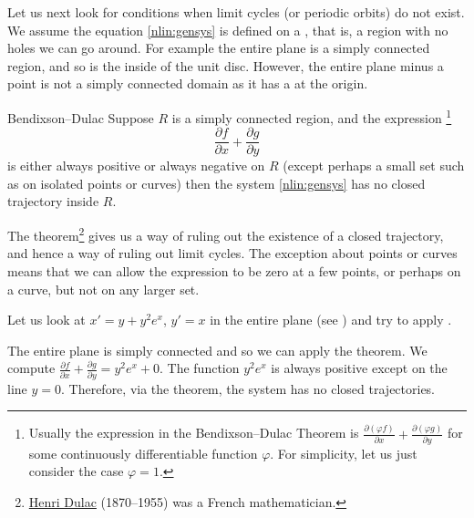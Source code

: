 \medskip

Let us next look for conditions when limit cycles (or periodic orbits) do not exist.
We assume
the equation \eqref{nlin:gensys} is defined on a
\emph{}, that is, a region with no holes
we can go around.  For example the entire plane is a simply
connected region, and so is the inside of the unit disc.  However,
the entire plane minus a point is not a simply connected domain as it has a
 at the origin.

\begin{theorem1}[thm:BD]{Bendixson--Dulac%
}%
Suppose $R$ is a simply connected region,
and the expression%
\footnote{Usually the expression in the Bendixson--Dulac Theorem is
$\frac{\partial (\varphi f)}{\partial x} + \frac{\partial (\varphi
g)}{\partial y}$
for some continuously differentiable function $\varphi$.  For simplicity,
let us just consider the case $\varphi = 1$.}
\begin{equation*}
\frac{\partial f}{\partial x} + \frac{\partial g}{\partial y}
\end{equation*}
is either always positive or always negative
on $R$ (except perhaps a small set such as on isolated points or curves)
then the system \eqref{nlin:gensys}
has no closed trajectory inside $R$.
\end{theorem1}

The theorem\footnote{%
\href{https://en.wikipedia.org/wiki/Henri_Dulac}{Henri Dulac} (1870--1955)
was a French mathematician.} gives us a way of ruling out the existence of a closed
trajectory, and hence a
way of ruling out limit cycles.
The exception about points or curves 
means that we can allow the expression to be zero at a few points,
or perhaps on a curve, but not on any larger set.

\begin{example}
Let us look at $x'=y+y^2e^x$, $y'=x$ in the entire plane (see
) and try to apply .
\end{example}
\begin{exampleSol}
The entire plane
is simply connected and so we can apply the theorem.  We compute
$\frac{\partial f}{\partial x} + \frac{\partial g}{\partial y} =
y^2e^x+ 0$.  The function $y^2e^x$ is always positive except on the line
$y=0$.  Therefore, via the theorem, the system has no closed trajectories.
\end{exampleSol}

